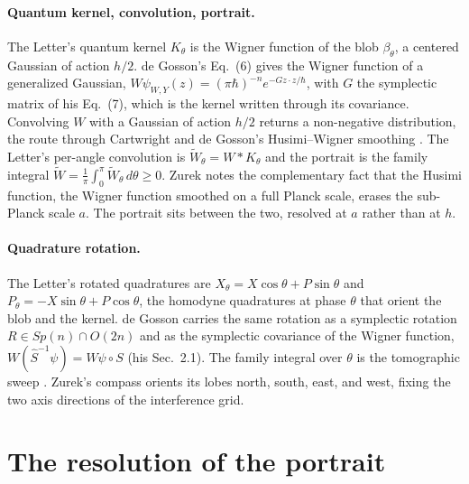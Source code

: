 \documentclass[%
  aps, amsmath, amssymb, onecolumn, 11pt
]{revtex4-2}
\begin{document}
\paragraph{Quantum kernel, convolution, portrait.}
The Letter's quantum kernel $K_\theta$ is the Wigner function of the blob
$\beta_\theta$, a centered Gaussian of action $h/2$. de Gosson's Eq.~(6)
gives the Wigner function of a generalized Gaussian,
$W\psi_{W,Y}(z)=(\pi\hbar)^{-n}e^{-Gz\cdot z/\hbar}$, with $G$ the
symplectic matrix of his Eq.~(7), which is the kernel
written through its covariance. Convolving $W$ with a Gaussian of action
$h/2$ returns a non-negative distribution, the route through Cartwright
\cite{cartwright1976} and de Gosson's Husimi--Wigner smoothing
\cite{degosson2005bullsci}. The Letter's per-angle convolution is
$\widetilde W_\theta=W*K_\theta$ and the portrait is the family integral
$\widetilde W=\frac{1}{\pi}\int_0^\pi\widetilde W_\theta\,d\theta\ge 0$.
Zurek notes the complementary fact that the Husimi function, the Wigner
function smoothed on a full Planck scale, erases the sub-Planck scale $a$.
The portrait sits between the two, resolved at $a$ rather than at
$h$.

\paragraph{Quadrature rotation.}
The Letter's rotated quadratures are
$X_\theta=X\cos\theta+P\sin\theta$ and
$P_\theta=-X\sin\theta+P\cos\theta$, the homodyne quadratures at phase
$\theta$ that orient the blob and the kernel. de Gosson carries the same
rotation as a symplectic rotation $R\in Sp(n)\cap O(2n)$ and as the
symplectic covariance of the Wigner function, $W(\hat S^{-1}\psi)=W\psi\circ S$
(his Sec.~2.1). The family integral over $\theta$ is the tomographic sweep
\cite{degosson2022radon, darianomacconeparis2001}. Zurek's compass orients
its lobes north, south, east, and west, fixing the two axis directions of
the interference grid.


\section{The resolution of the portrait}
\label{sec:resolution}
\end{document}

